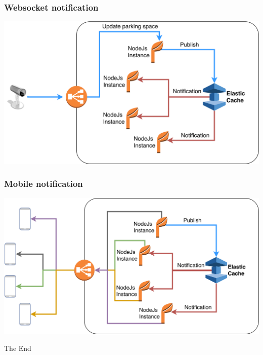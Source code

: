 \documentclass{beamer}
\begin{document}
\begin{frame}
\frametitle{Websocket notification}
\centerline{\includegraphics[scale=0.08]{../img/updateps.png}}
\end{frame}


\begin{frame}
\frametitle{Mobile notification}
\centerline{\includegraphics[scale=0.08]{../img/notification.png}}
\end{frame}





\begin{frame}
\Huge{\centerline{The End}}
\end{frame}

\end{document}
